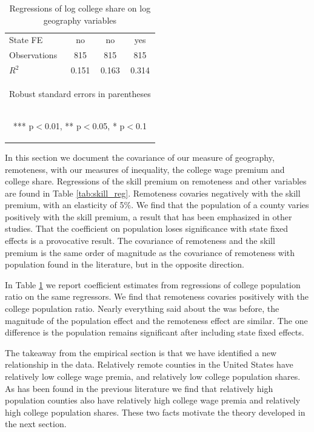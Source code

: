 \documentclass{article}
\begin{document}
\begin{table}
\begin{tabular}{lccc}
    State FE & \mbox{no} & \mbox{no} & \mbox{yes} \\
    Observations & 815 & 815 & 815 \\
     $R^2$ & 0.151 & 0.163 & 0.314 \\ \hline
    \multicolumn{4}{c}{\begin{footnotesize} Robust standard errors in parentheses\end{footnotesize}} \\
    \multicolumn{4}{c}{\begin{footnotesize} *** p$<$0.01, ** p$<$0.05, * p$<$0.1\end{footnotesize}} \\
    \end{tabular}
   \caption{Regressions of log college share on log geography variables}
    \label{tab:col_reg}
\end{table}

In this section we document the covariance of our measure of geography, remoteness, with our measures of inequality, the college wage premium and college share.  Regressions of the skill premium on remoteness and other variables are found in Table \ref{tab:skill_reg}.  Remoteness covaries negatively with the skill premium, with an elasticity of 5\%.  We find that the population of a county varies positively with the skill premium, a result that has been emphasized in other studies.  That the coefficient on population loses significance with state fixed effects is a provocative result.  The covariance of remoteness and the skill premium is the same order of magnitude as the covariance of remoteness with population found in the literature, but in the opposite direction.

In Table \ref{tab:col_reg} we report coefficient estimates from regressions of college population ratio on the same regressors.  We find that remoteness covaries positively with the college population ratio.  Nearly everything said about the was before, the magnitude of the population effect and the remoteness effect are similar.  The one difference is the population remains significant after including state fixed effects.

The takeaway from the empirical section is that we have identified a new relationship in the data.  Relatively remote counties in the United States have relatively low college wage premia, and relatively low college population shares.  As has been found in the previous literature we find that relatively high population counties also have relatively high college wage premia and relatively high college population shares.  These two facts motivate the theory developed in the next section.
\end{document}
